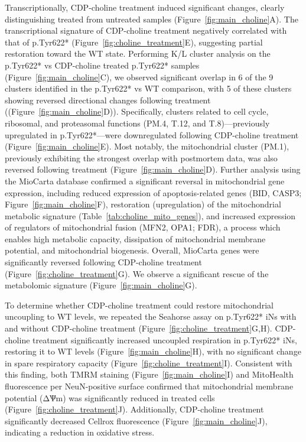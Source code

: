 Transcriptionally, CDP-choline treatment induced significant changes, clearly distinguishing treated from untreated samples (Figure~\ref{fig:main_choline}A). The transcriptional signature of CDP-choline treatment negatively correlated with that of p.Tyr622* (Figure~\ref{fig:choline_treatment}E), suggesting partial restoration toward the WT state. Performing K/L cluster analysis on the p.Tyr622* vs CDP-choline treated p.Tyr622* samples (Figure~\ref{fig:main_choline}C), we observed significant overlap in 6 of the 9 clusters identified in the p.Tyr622* vs WT comparison, with 5 of these clusters showing reversed directional changes following treatment ((Figure~\ref{fig:main_choline}D)). Specifically, clusters related to cell cycle, ribosomal, and proteasomal functions (PM.4, T.12, and T.8)—previously upregulated in p.Tyr622*—were downregulated following CDP-choline treatment (Figure~\ref{fig:main_choline}E). Most notably, the mitochondrial cluster (PM.1), previously exhibiting the strongest overlap with postmortem data, was also reversed following treatment (Figure~\ref{fig:main_choline}D). Further analysis using the MioCarta database confirmed a significant reversal in mitochondrial gene expression, including reduced expression of apoptosis-related genes (BID, CASP3; Figure~\ref{fig:main_choline}F), restoration (upregulation) of the mitochondrial metabolic signature (Table~\ref{tab:choline_mito_genes}), and increased expression of regulators of mitochondrial fusion (MFN2, OPA1; FDR), a process which enables high metabolic capacity, dissipation of mitochondrial membrane potential, and mitochondrial biogenesis. Overall, MioCarta genes were significantly reversed following CDP-choline treatment (Figure~\ref{fig:choline_treatment}G). We observe a significant rescue of the metabolomic signature (Figure~\ref{fig:main_choline}G).

To determine whether CDP-choline treatment could restore mitochondrial uncoupling to WT levels, we repeated the Seahorse assay on p.Tyr622* iNs with and without CDP-choline treatment (Figure~\ref{fig:choline_treatment}G,H). CDP-choline treatment significantly increased uncoupled respiration in p.Tyr622* iNs, restoring it to WT levels (Figure~\ref{fig:main_choline}H), with no significant change in spare respiratory capacity (Figure~\ref{fig:choline_treatment}I). Consistent with this finding, both TMRM staining (Figure~\ref{fig:main_choline}I) and MitoHealth fluorescence per NeuN-positive surface confirmed that mitochondrial membrane potential (ΔѰm) was significantly reduced in treated cells (Figure~\ref{fig:choline_treatment}J). Additionally, CDP-choline treatment significantly decreased Cellrox fluorescence (Figure~\ref{fig:main_choline}J), indicating a reduction in oxidative stress. 

